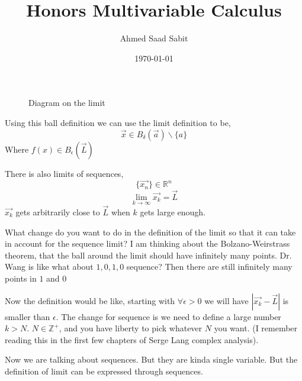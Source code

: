 \documentclass[letterpaper]{article}
\title{Honors Multivariable Calculus}
\author{Ahmed Saad Sabit}
\date{\today}
\begin{document}
\maketitle


\begin{figure}[ht]
    \centering
    \caption{Diagram on the limit}
    \label{fig:diagram-on-the-limit}
\end{figure}


Using this ball definition we can use the limit definition to be, 
\[
	\vec{x} \in B_\delta(\vec{a}) \smallsetminus \{a \}
\] 
Where $f(x) \in B_\epsilon(\vec{L})$

There is also limits of sequences,
\[
	\{ \vec{x_n} \} \in \mathbb{R}^{n}
\] 
\[
\lim_{k \to \infty}  \vec{x_k} = \vec{L}
\] 
$\vec{x_k}$ gets arbitrarily close to $\vec{L}$ when $k$ gets large enough.

What change do you want to do in the definition of the limit so that it can take in account for the sequence limit? I am thinking about the Bolzano-Weirstrass theorem, that the ball around the limit should have infinitely many points. Dr. Wang is like what about $1,0,1,0$ sequence? Then there are still infinitely many points in $1 $ and $0$

Now the definition would be like, starting with $\forall \epsilon>0$ we will have $|\vec{x_k} - \vec{L}|$ is smaller than $\epsilon$. The change for sequence is we need to define a large number $k > N$. $N \in \mathbb{Z}^{+}$, and you have liberty to pick whatever $N$ you want. (I remember reading this in the first few chapters of Serge Lang complex analysis). 


Now we are talking about sequences. But they are kinda single variable. But the definition of limit can be expressed through sequences. 
\end{document}
